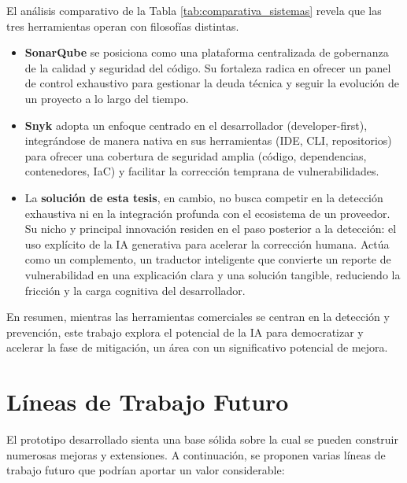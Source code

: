 El análisis comparativo de la Tabla \ref{tab:comparativa_sistemas} revela que las tres herramientas operan con filosofías distintas. 
\begin{itemize}
    \item \textbf{SonarQube} se posiciona como una plataforma centralizada de gobernanza de la calidad y seguridad del código. Su fortaleza radica en ofrecer un panel de control exhaustivo para gestionar la deuda técnica y seguir la evolución de un proyecto a lo largo del tiempo.
    \item \textbf{Snyk} adopta un enfoque centrado en el desarrollador (developer-first), integrándose de manera nativa en sus herramientas (IDE, CLI, repositorios) para ofrecer una cobertura de seguridad amplia (código, dependencias, contenedores, IaC) y facilitar la corrección temprana de vulnerabilidades.
    \item La \textbf{solución de esta tesis}, en cambio, no busca competir en la detección exhaustiva ni en la integración profunda con el ecosistema de un proveedor. Su nicho y principal innovación residen en el paso posterior a la detección: el uso explícito de la IA generativa para acelerar la corrección humana. Actúa como un complemento, un traductor inteligente que convierte un reporte de vulnerabilidad en una explicación clara y una solución tangible, reduciendo la fricción y la carga cognitiva del desarrollador.
\end{itemize}

En resumen, mientras las herramientas comerciales se centran en la detección y prevención, este trabajo explora el potencial de la IA para democratizar y acelerar la fase de mitigación, un área con un significativo potencial de mejora.

\section{Líneas de Trabajo Futuro}\label{sec:trabajofuturo}

El prototipo desarrollado sienta una base sólida sobre la cual se pueden construir numerosas mejoras y extensiones. A continuación, se proponen varias líneas de trabajo futuro que podrían aportar un valor considerable:

